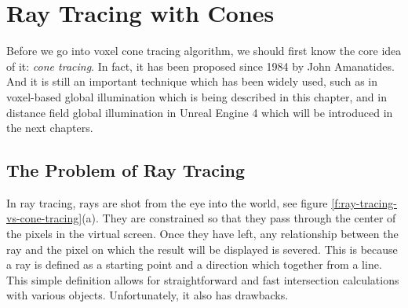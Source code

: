 \section{Ray Tracing with Cones}
Before we go into voxel cone tracing algorithm, we should first know the core idea of it: \textit{cone tracing}. In fact, it has been proposed since 1984 by John Amanatides\cite{a:RayTracingwithCones}. And it is still an important technique which has been widely used, such as in voxel-based global illumination which is being described in this chapter, and in distance field global illumination in Unreal Engine 4 which will be introduced in the next chapters.


\subsection{The Problem of Ray Tracing}
In ray tracing, rays are shot from the eye into the world, see figure \ref{f:ray-tracing-vs-cone-tracing}(a). They are constrained so that they pass through the center of the pixels in the virtual screen. Once they have left, any relationship between the ray and the pixel on which the result will be displayed is severed. This is because a ray is defined as a starting point and a direction which together from a line. This simple definition allows for straightforward and fast intersection calculations with various objects. Unfortunately, it also has drawbacks.

